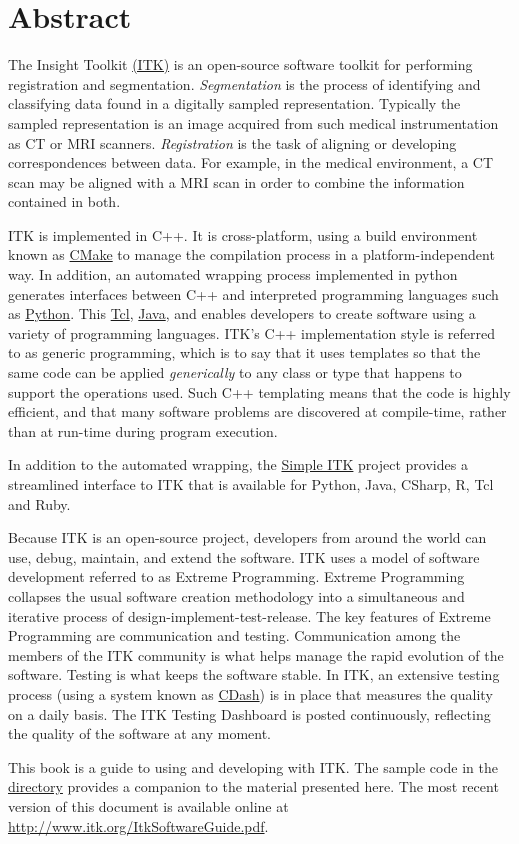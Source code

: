 \chapter*{Abstract}
\noindent
The Insight Toolkit \href{http://www.itk.org}{(ITK)} is an open-source
software toolkit for performing registration and
segmentation. \emph{Segmentation} is the process of identifying and
classifying data found in a digitally sampled
representation. Typically the sampled representation is an image
acquired from such medical instrumentation as CT or MRI
scanners. \emph{Registration} is the task of aligning or developing
correspondences between data. For example, in the medical environment,
a CT scan may be aligned with a MRI scan in order to combine the
information contained in both.

ITK is implemented in C++. It is cross-platform, using a build
environment known as \href{http://www.cmake.org}{CMake} to manage the
compilation process in a platform-independent way.
In addition, an automated wrapping process implemented in python
generates interfaces between C++ and interpreted programming languages
such as
\href{http://www.python.org}{Python}. This
\href{http://tcl.sourceforge.net}{Tcl},
\href{http://java.sun.com}{Java}, and
enables developers to create software using a variety of programming
languages. ITK's C++ implementation style is referred to as generic
programming, which is to say that it uses templates so that the same
code can be applied \emph{generically} to any class or type that
happens to support the operations used. Such C++
templating means that the code is highly efficient, and that many
software problems are discovered at compile-time, rather than at
run-time during program execution.

In addition to the automated wrapping, the
\href{http://www.itk.org/Wiki/SimpleITK}{Simple ITK} project provides
a streamlined interface to ITK that is available for Python, Java,
CSharp, R, Tcl and Ruby. 

Because ITK is an open-source project, developers from around the
world can use, debug, maintain, and extend the software. ITK uses a
model of software development referred to as Extreme
Programming. Extreme Programming collapses the usual software creation
methodology into a simultaneous and iterative process of
design-implement-test-release. The key features of Extreme Programming
are communication and testing. Communication among the members of the
ITK community is what helps manage the rapid evolution of the
software.  Testing is what keeps the software stable. In ITK, an
extensive testing process (using a system known as
\href{http://public.kitware.com/dashboard.php?name=itk}{CDash}) is in place that
measures the quality on a daily basis. The ITK Testing Dashboard is
posted continuously, reflecting the quality of the software at any
moment.

This book is a guide to using and developing with ITK. The sample code
in the
\href{http://itk.org/gitweb?p=ITK.git}
{directory} provides a companion to the material presented here.  The
most recent version of this document is available online at
\url{http://www.itk.org/ItkSoftwareGuide.pdf}.


